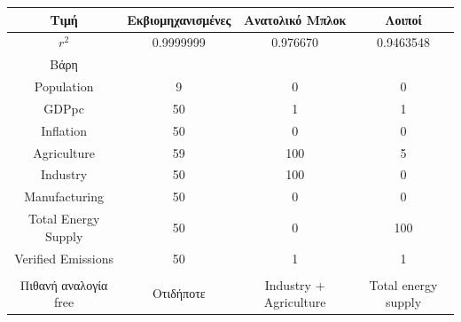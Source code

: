 \documentclass[a4paper,twoside,10pt]{article}
\begin{document}
\begin{table}[H]
	\centering
	\begin{tabular}{|c|c|c|c|}
		\hline
		Τιμή & Εκβιομηχανισμένες & Ανατολικό Μπλοκ & Λοιποί \\
		\hline
		$r^2$ & 0.9999999 & 0.976670 & 0.9463548 \\
		\hline
		Βάρη &  &  &  \\
		\hline
		Population & 9 & 0 & 0 \\
		\hline
		GDPpc & 50 & 1 & 1 \\
		\hline
		Inflation & 50 & 0 & 0 \\
		\hline
		Agriculture & 59 & 100 & 5 \\
		\hline
		Industry & 50 & 100 & 0 \\
		\hline
		Manufacturing & 50 & 0 & 0 \\
		\hline
		Total Energy Supply & 50 & 0 & 100 \\
		\hline
		Verified Emissions & 50 & 1 & 1 \\
		\hline
		&  &  &  \\
		\hline
		Πιθανή αναλογία free & Οτιδήποτε & Industry + Agriculture & Total energy supply \\
		\hline
	\end{tabular}
\end{table}
\end{document}
